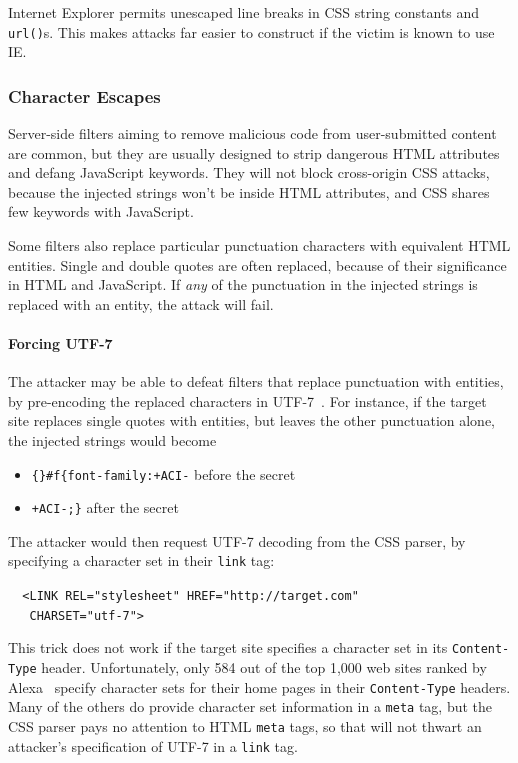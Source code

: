 \documentclass{sig-alternate}
\begin{document}
Internet Explorer permits unescaped line breaks in CSS string
constants and \texttt{url()}s. This makes attacks far easier to
construct if the victim is known to use IE.

\subsubsection{Character Escapes} \label{sec:utf7}
Server-side filters aiming to remove malicious code from
user-submitted content are common, but they are usually designed to
strip dangerous HTML attributes and defang JavaScript keywords.  They
will not block cross-origin CSS attacks, because the injected strings
won't be inside HTML attributes, and CSS shares few
keywords with JavaScript.

Some filters also replace particular punctuation characters with
equivalent HTML entities.  Single and double quotes are often
replaced, because of their significance in HTML and JavaScript.  If
\emph{any} of the punctuation in the injected strings is replaced with
an entity, the attack will fail.

\paragraph{Forcing UTF-7}
The attacker may be able to defeat filters that replace punctuation
with entities, by pre-encoding the replaced characters in
UTF-7~\cite{utf7}.  For instance, if the target site replaces single
quotes with entities, but leaves the other punctuation alone, the
injected strings would become
\begin{itemize}
\item \verb|{}#f{font-family:+ACI-| before the secret
\item \verb|+ACI-;}| after the secret
\end{itemize}
The attacker would then request UTF-7 decoding from the CSS parser,
by specifying a character set in their \verb|link| tag:

\noindent
\verb|  <LINK REL="stylesheet" HREF="http://target.com"|\\
\verb|   CHARSET="utf-7">|

\noindent
This trick does not work if the target site specifies a character set
in its \texttt{Content-Type} header.  Unfortunately, only 584 out of
the top 1,000 web sites ranked by Alexa~\cite{alexa} specify character
sets for their home pages in their \texttt{Content-Type} headers.
Many of the others do provide character set information in a
\verb|meta| tag, but the CSS parser pays no attention to HTML
\verb|meta| tags, so that will not thwart an attacker's specification
of UTF-7 in a \verb|link| tag.
\end{document}
